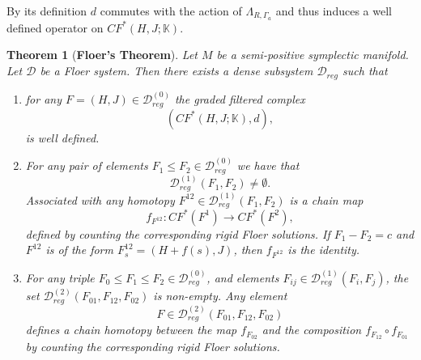 \documentclass[11pt]{amsart}
\newcommand{\K}{\mathbb{K}}
\newtheorem{tm}{Theorem}[section]
\theoremstyle{definition}
\theoremstyle{remark}
\begin{document}
By its definition $d$ commutes with the action of $\Lambda_{R,\Gamma_a}$ and thus induces a well defined operator on $CF^*(H,J;\K)$.



\begin{tm}[\textbf{Floer's Theorem}]\label{tmFloerFunc}
Let $M$ be a semi-positive symplectic manifold. Let $\mathcal{D}$ be a Floer system. Then there exists a dense subsystem $\mathcal{D}_{reg}$ such that
\begin{enumerate}
\item
for any $F=(H,J)\in \mathcal{D}^{(0)}_{reg}$ the graded filtered complex
\[
        (CF^*(H,J;\K),d),
\]
is well defined.
\item For any pair of elements $F_1\leq F_2\in  \mathcal{D}^{(0)}_{reg}$ we have that
        \[
            \mathcal{D}_{reg}^{(1)}(F_1,F_2)\neq\emptyset.
         \]
         Associated with any homotopy $F^{12}\in\mathcal{D}^{(1)}_{reg}(F_1,F_2)$  is a chain map
    \[
        f_{F^{12}}:CF^*(F^1)\to CF^*(F^2),
    \]
    defined by counting the corresponding rigid Floer solutions. If  $F_1-F_2=c$ and $F^{12}$ is of the form $F^{12}_s=(H+f(s),J)$, then $f_{F^{12}}$ is the identity.
    \item
    For any triple $F_0\leq F_1\leq F_2\in\mathcal{D}_{reg}^{(0)}$, and elements $F_{ij}\in\mathcal{D}_{reg}^{(1)}(F_i,F_j)$, the set $\mathcal{D}_{reg}^{(2)}(F_{01},F_{12},F_{02})$ is non-empty.
    Any element
    \[
    F\in\mathcal{D}_{reg}^{(2)}(F_{01},F_{12},F_{02})
    \]
    defines a chain homotopy between the map
    $f_{F_{02}}$ and the composition $f_{F_{12}}\circ f_{F_{01}}$
    by counting the corresponding rigid Floer solutions.

\end{enumerate}
\end{tm}
\end{document}
